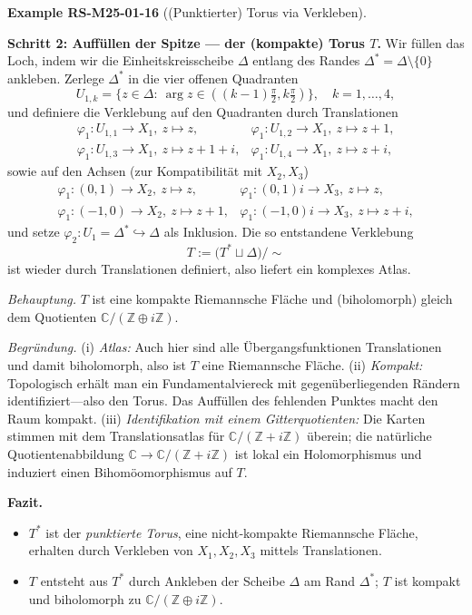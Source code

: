 \documentclass[10pt, letterpaper]{article}
\newcommand{\Z}{\mathbb{Z}}
\newcommand{\C}{\mathbb{C}}
\newcommand{\CustomHeading}[3]{%
  \par\medskip\noindent%
  \textbf{#1 #2} \textnormal{(#3)}.\enskip%
}
\newenvironment{EXA}[2]{\begin{unitbox}\CustomHeading{Example}{#1}{#2}}{\end{unitbox}}
\begin{document}
\begin{EXA}{RS-M25-01-16}{(Punktierter) Torus via Verkleben}
\medskip
\textbf{Schritt 2: Auffüllen der Spitze — der (kompakte) Torus $T$.}
Wir füllen das Loch, indem wir die Einheitskreisscheibe $\Delta$ entlang des
Randes $\Delta^*=\Delta\setminus\{0\}$ ankleben.
Zerlege $\Delta^*$ in die vier offenen Quadranten
\[
U_{1,k}=\{z\in\Delta:\ \arg z\in((k-1)\tfrac{\pi}{2},k\tfrac{\pi}{2})\},\quad k=1,\dots,4,
\]
und definiere die Verklebung auf den Quadranten durch Translationen
\[
\begin{array}{ll}
\varphi_1:U_{1,1}\to X_1,\ z\mapsto z,&
\varphi_1:U_{1,2}\to X_1,\ z\mapsto z+1,\\[2pt]
\varphi_1:U_{1,3}\to X_1,\ z\mapsto z+1+i,&
\varphi_1:U_{1,4}\to X_1,\ z\mapsto z+i,
\end{array}
\]
sowie auf den Achsen (zur Kompatibilität mit $X_2,X_3$)
\[
\begin{array}{ll}
\varphi_1:(0,1)\to X_2,\ z\mapsto z, & \varphi_1:(0,1)i\to X_3,\ z\mapsto z,\\
\varphi_1:(-1,0)\to X_2,\ z\mapsto z+1, & \varphi_1:(-1,0)i\to X_3,\ z\mapsto z+i,
\end{array}
\]
und setze $\varphi_2:U_1=\Delta^*\hookrightarrow\Delta$ als Inklusion.
Die so entstandene Verklebung
\[
T:=\bigl(T^*\sqcup\Delta\bigr)\big/\!\sim
\]
ist wieder durch Translationen definiert, also liefert ein komplexes Atlas.

\textit{Behauptung.} $T$ ist eine kompakte Riemannsche Fläche und (biholomorph)
gleich dem Quotienten $\C/(\Z\oplus i\Z)$.

\textit{Begründung.} (i) \emph{Atlas:} Auch hier sind alle Übergangsfunktionen
Translationen und damit biholomorph, also ist $T$ eine Riemannsche Fläche.
(ii) \emph{Kompakt:} Topologisch erhält man ein Fundamentalviereck mit gegenüberliegenden
Rändern identifiziert—also den Torus. Das Auffüllen des fehlenden Punktes macht
den Raum kompakt. (iii) \emph{Identifikation mit einem Gitterquotienten:}
Die Karten stimmen mit dem Translationsatlas für $\C/(\Z+i\Z)$ überein; die natürliche
Quotientenabbildung $\C\to \C/(\Z+i\Z)$ ist lokal ein Holomorphismus und induziert
einen Bihomöomorphismus auf $T$.

\medskip
\textbf{Fazit.}
\begin{itemize}
\item $T^*$ ist der \emph{punktierte Torus}, eine nicht‐kompakte Riemannsche Fläche,
erhalten durch Verkleben von $X_1,X_2,X_3$ mittels Translationen.
\item $T$ entsteht aus $T^*$ durch Ankleben der Scheibe $\Delta$ am Rand $\Delta^*$;
$T$ ist kompakt und biholomorph zu $\C/(\Z\oplus i\Z)$.
\end{itemize}
\end{EXA}
\end{document}
